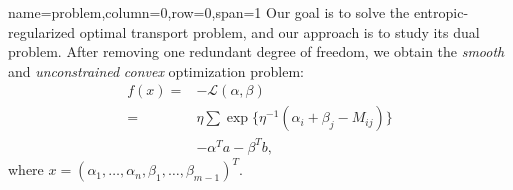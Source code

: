{name=problem,column=0,row=0,span=1}
{
    Our goal is to solve the entropic-regularized optimal transport problem, and our approach is to study its dual problem. After removing one redundant degree of freedom, we obtain the \emph{smooth} and \emph{unconstrained} \emph{convex} optimization problem:
    \begin{align*}
    f(x)= & -\mathcal{L}(\alpha, \beta) \\
        = & \eta\sum\exp\{\eta^{-1}(\alpha_{i}+\beta_{j}-M_{ij})\}\nonumber\\
          & -\alpha^T a-\beta^T b, \label{eq:objective}
    \end{align*}
    where $x = (\alpha_1,\ldots,\alpha_n,\beta_1,\ldots,\beta_{m-1})^T$.
}